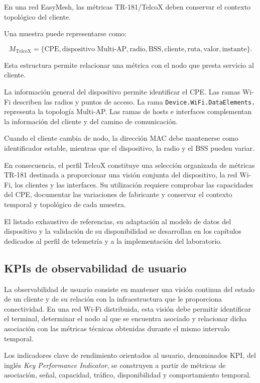 En una red EasyMesh, las métricas TR-181/TelcoX deben conservar el
contexto topológico del cliente.

Una muestra puede representarse como:

\[
    M_{\mathrm{TelcoX}}
    =
    \{
        \text{CPE},
        \text{dispositivo Multi-AP},
        \text{radio},
        \text{BSS},
        \text{cliente},
        \text{ruta},
        \text{valor},
        \text{instante}
    \}.
\]

Esta estructura permite relacionar una métrica con el nodo que presta
servicio al cliente.

La información general del dispositivo permite identificar el CPE. Las
ramas Wi-Fi describen las radios y puntos de acceso. La rama
\texttt{Device.WiFi.DataElements.} representa la topología Multi-AP. Las
ramas de hosts e interfaces complementan la información del cliente y del
camino de comunicación.

Cuando el cliente cambia de nodo, la dirección MAC debe mantenerse como
identificador estable, mientras que el dispositivo, la radio y el BSS
pueden variar.

En consecuencia, el perfil TelcoX constituye una selección organizada de
métricas TR-181 destinada a proporcionar una visión conjunta del
dispositivo, la red Wi-Fi, los clientes y las interfaces. Su utilización
requiere comprobar las capacidades del CPE, documentar las variaciones de
fabricante y conservar el contexto temporal y topológico de cada muestra.

El listado exhaustivo de referencias, su adaptación al modelo de datos
del dispositivo y la validación de su disponibilidad se desarrollan en
los capítulos dedicados al perfil de telemetría y a la implementación del
laboratorio.

\subsection{KPIs de observabilidad de usuario}
\label{subsec:kpis-observabilidad-usuario}

La observabilidad de usuario consiste en mantener una visión continua
del estado de un cliente y de su relación con la infraestructura que le
proporciona conectividad. En una red Wi-Fi distribuida, esta visión debe
permitir identificar el terminal, determinar el nodo al que se encuentra
asociado y relacionar dicha asociación con las métricas técnicas
obtenidas durante el mismo intervalo temporal.

Los indicadores clave de rendimiento orientados al usuario, denominados
KPI, del inglés \textit{Key Performance Indicator}, se construyen a
partir de métricas de asociación, señal, capacidad, tráfico,
disponibilidad y comportamiento temporal.

